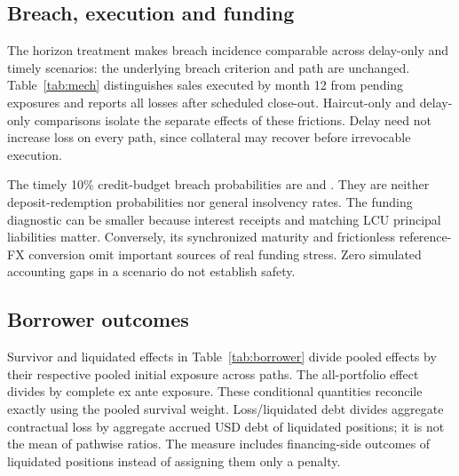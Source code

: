 \documentclass[11pt,a4paper]{article}
\begin{document}
\subsection{Breach, execution and funding}
The horizon treatment makes breach incidence comparable across delay-only and timely scenarios: the underlying breach criterion and path are unchanged. Table~\ref{tab:mech} distinguishes sales executed by month 12 from pending exposures and reports all losses after scheduled close-out. Haircut-only and delay-only comparisons isolate the separate effects of these frictions. Delay need not increase loss on every path, since collateral may recover before irrevocable execution.
\begin{table}[H]\centering\small\setlength{\tabcolsep}{4pt}
\caption{ETH, adaptive rule. Breach, executed and pending are percentages of initial exposure; executed + pending = breach at month 12. Loss and CVaR$_{99}$ include all scheduled close-outs and use initial principal as denominator.}\label{tab:mech}\end{table}
\begin{table}[H]\centering\small\setlength{\tabcolsep}{4pt}
\caption{Different risk measures, ETH adaptive rule. Any liq. = percentage of paths with any cohort liquidation; Under-coll. = initial exposure pending and below CR 1 at month 12; Credit budget = percentage of paths with gross credit loss above 10\% of initial principal; Capital gap = percentage with a negative matched-funding settlement ledger.}\label{tab:capital}\end{table}

The timely 10\% credit-budget breach probabilities are \ArsReserve{} and \TryReserve{}. They are neither deposit-redemption probabilities nor general insolvency rates. The funding diagnostic can be smaller because interest receipts and matching LCU principal liabilities matter. Conversely, its synchronized maturity and frictionless reference-FX conversion omit important sources of real funding stress. Zero simulated accounting gaps in a scenario do not establish safety.

\subsection{Borrower outcomes}
Survivor and liquidated effects in Table~\ref{tab:borrower} divide pooled effects by their respective pooled initial exposure across paths. The all-portfolio effect divides by complete ex ante exposure. These conditional quantities reconcile exactly using the pooled survival weight. Loss/liquidated debt divides aggregate contractual loss by aggregate accrued USD debt of liquidated positions; it is not the mean of pathwise ratios. The measure includes financing-side outcomes of liquidated positions instead of assigning them only a penalty.
\begin{table}[H]\centering\small
\caption{ETH, timely auctions. Financing-side effects (survivors, liquidated, all) are percentages of the respective initial exposure; the final column is credit loss as a percentage of accrued liquidated debt.}\label{tab:borrower}\end{table}
\end{document}
